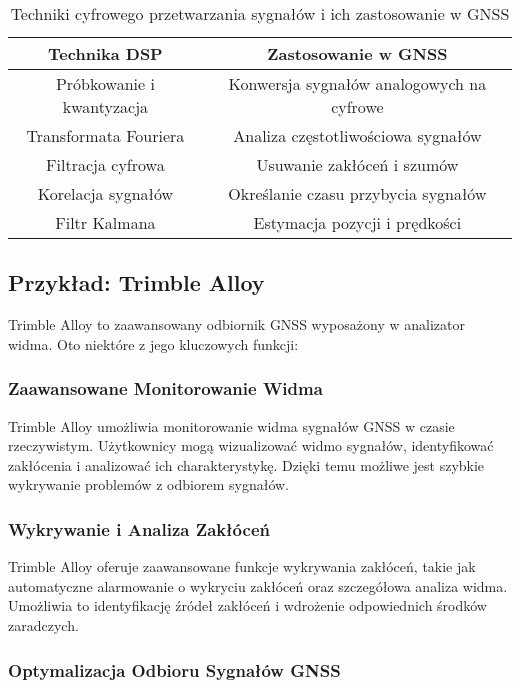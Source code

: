 \begin{table}[h!]
\centering
\begin{tabular}{|c|c|}
\hline
\textbf{Technika DSP} & \textbf{Zastosowanie w GNSS} \\
\hline
Próbkowanie i kwantyzacja & Konwersja sygnałów analogowych na cyfrowe \\
Transformata Fouriera & Analiza częstotliwościowa sygnałów \\
Filtracja cyfrowa & Usuwanie zakłóceń i szumów \\
Korelacja sygnałów & Określanie czasu przybycia sygnałów \\
Filtr Kalmana & Estymacja pozycji i prędkości \\
\hline
\end{tabular}
\caption{Techniki cyfrowego przetwarzania sygnałów i ich zastosowanie w GNSS}
\label{tab:dsp_techniques_gnss}
\end{table}

\subsection{Przykład: Trimble Alloy}

Trimble Alloy to zaawansowany odbiornik GNSS wyposażony w analizator widma. Oto niektóre z jego kluczowych funkcji:

\subsubsection{Zaawansowane Monitorowanie Widma}

Trimble Alloy umożliwia monitorowanie widma sygnałów GNSS w czasie rzeczywistym. Użytkownicy mogą wizualizować widmo sygnałów, identyfikować zakłócenia i analizować ich charakterystykę. Dzięki temu możliwe jest szybkie wykrywanie problemów z odbiorem sygnałów.

\subsubsection{Wykrywanie i Analiza Zakłóceń}

Trimble Alloy oferuje zaawansowane funkcje wykrywania zakłóceń, takie jak automatyczne alarmowanie o wykryciu zakłóceń oraz szczegółowa analiza widma. Umożliwia to identyfikację źródeł zakłóceń i wdrożenie odpowiednich środków zaradczych.

\subsubsection{Optymalizacja Odbioru Sygnałów GNSS}

